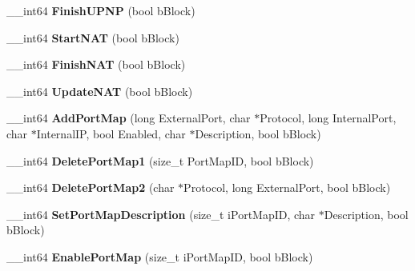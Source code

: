 \begin{DoxyCompactItemize}
\item 
\hypertarget{classcl_u_pn_p_thread_aac887f1507d7d59f4f0bcc4f438b4a06}{
\_\-\_\-int64 {\bfseries FinishUPNP} (bool bBlock)}
\label{classcl_u_pn_p_thread_aac887f1507d7d59f4f0bcc4f438b4a06}

\item 
\hypertarget{classcl_u_pn_p_thread_a49e2ba591828a86667cc9faf577bbd51}{
\_\-\_\-int64 {\bfseries StartNAT} (bool bBlock)}
\label{classcl_u_pn_p_thread_a49e2ba591828a86667cc9faf577bbd51}

\item 
\hypertarget{classcl_u_pn_p_thread_a8755c082671f07752cb0533f0e654978}{
\_\-\_\-int64 {\bfseries FinishNAT} (bool bBlock)}
\label{classcl_u_pn_p_thread_a8755c082671f07752cb0533f0e654978}

\item 
\hypertarget{classcl_u_pn_p_thread_a656620f96aa8e449f32a2e3100b688d8}{
\_\-\_\-int64 {\bfseries UpdateNAT} (bool bBlock)}
\label{classcl_u_pn_p_thread_a656620f96aa8e449f32a2e3100b688d8}

\item 
\hypertarget{classcl_u_pn_p_thread_ac80f05a1ea6e9a4eafed0eb57b0b0d94}{
\_\-\_\-int64 {\bfseries AddPortMap} (long ExternalPort, char $\ast$Protocol, long InternalPort, char $\ast$InternalIP, bool Enabled, char $\ast$Description, bool bBlock)}
\label{classcl_u_pn_p_thread_ac80f05a1ea6e9a4eafed0eb57b0b0d94}

\item 
\hypertarget{classcl_u_pn_p_thread_ad37827d165619f845c7ccfa92ce6e641}{
\_\-\_\-int64 {\bfseries DeletePortMap1} (size\_\-t PortMapID, bool bBlock)}
\label{classcl_u_pn_p_thread_ad37827d165619f845c7ccfa92ce6e641}

\item 
\hypertarget{classcl_u_pn_p_thread_a4a29bba286b769f88db37c7d9a777c8c}{
\_\-\_\-int64 {\bfseries DeletePortMap2} (char $\ast$Protocol, long ExternalPort, bool bBlock)}
\label{classcl_u_pn_p_thread_a4a29bba286b769f88db37c7d9a777c8c}

\item 
\hypertarget{classcl_u_pn_p_thread_a200471a57eac647f184da06291c4434f}{
\_\-\_\-int64 {\bfseries SetPortMapDescription} (size\_\-t iPortMapID, char $\ast$Description, bool bBlock)}
\label{classcl_u_pn_p_thread_a200471a57eac647f184da06291c4434f}

\item 
\hypertarget{classcl_u_pn_p_thread_a9fdb23e8b1eded0f146e29f30480820b}{
\_\-\_\-int64 {\bfseries EnablePortMap} (size\_\-t iPortMapID, bool bBlock)}
\label{classcl_u_pn_p_thread_a9fdb23e8b1eded0f146e29f30480820b}


\end{DoxyCompactItemize}
